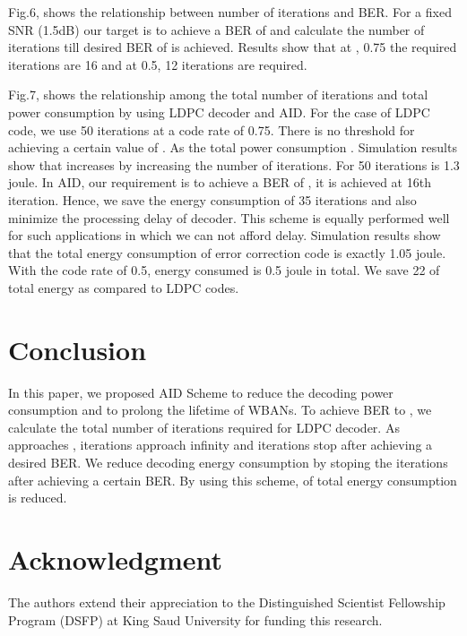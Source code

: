 \documentclass[3p,times,procedia]{elsarticle}
\begin{document}
Fig.6, shows the relationship between number of iterations and BER. For a fixed SNR (1.5dB) our target is to achieve a  BER of  and calculate the number of iterations till desired BER of  is achieved. Results show that at , 0.75 the required iterations are 16 and at  0.5, 12 iterations are required.

Fig.7, shows the relationship among the total number of iterations and total power consumption by using LDPC decoder and AID. For the case of LDPC code, we use 50 iterations at a code rate of 0.75. There is no threshold for achieving a certain value of . As  the total power consumption . Simulation results show that  increases by increasing the number of iterations. For 50 iterations  is 1.3 joule.
In AID, our requirement is to achieve a BER of , it is achieved at 16th iteration. Hence, we save the energy consumption of 35 iterations and also minimize the processing delay of decoder. This scheme is equally performed well for such applications in which we can not afford delay. Simulation results show that the total energy consumption of error correction code is exactly 1.05 joule. With the code rate of 0.5, energy consumed is 0.5 joule in total. We save 22 of total energy as compared to LDPC codes.






\vspace{-0.4cm}
\section{Conclusion}
\label{sec:majhead}
\vspace{-0.3cm}
In this paper, we proposed AID Scheme to reduce the decoding power consumption and to prolong the lifetime of WBANs. To achieve BER to , we calculate the total number of iterations required for LDPC decoder. As  approaches , iterations approach infinity and iterations stop after achieving a desired BER. We reduce decoding energy consumption by stoping the iterations after achieving a certain BER. By using this scheme,  of total energy consumption is reduced.

\vspace{-0.4cm}
\section{Acknowledgment}
\vspace{-0.3cm}
The authors extend their appreciation to the Distinguished Scientist Fellowship Program (DSFP) at King Saud University
for funding this research.
\end{document}
